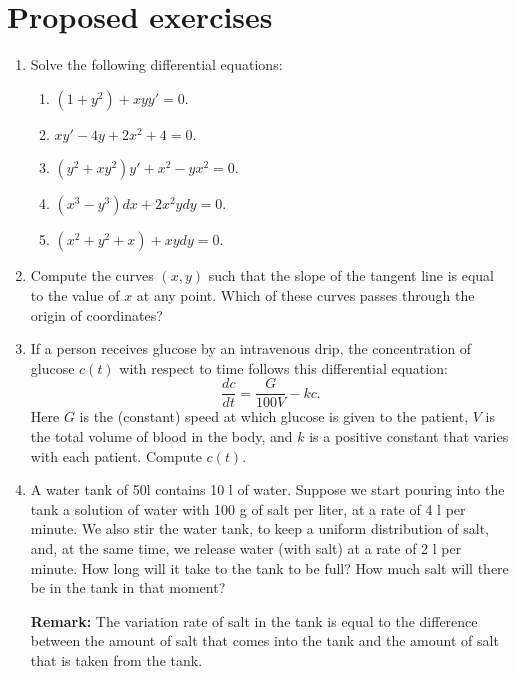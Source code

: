 \section{Proposed exercises}
\begin{enumerate}[leftmargin=*]

\item Solve the following differential equations:
\begin{enumerate}
\item $(1+y^{2})+xyy'=0$.
\item $xy'-4y+2x^2+4=0$.
\item $(y^{2}+xy^{2})y'+x^{2}-yx^{2}=0$.
\item $(x^3-y^3)dx+2x^2ydy=0$.
\item $(x^2+y^2+x)+xydy=0$.
\end{enumerate}

\item Compute the curves $(x,y)$ such that the slope of the tangent line is equal to the value of $x$ at any point.  
Which of these curves passes through the origin of coordinates?

\item If a person receives glucose by an intravenous drip, the concentration of glucose $c(t)$ with respect to time follows this differential equation:
\[
\frac{dc}{dt}=\frac{G}{100V}-kc.
\]
Here $G$ is the (constant) speed at which glucose is given to the patient, $V$ is the total volume of blood in the body, and $k$ is a positive constant that varies with each patient.
Compute $c(t)$.

\item A water tank of 50l contains 10 l of water.
Suppose we start pouring into the tank a solution of water with 100 g of salt per liter, at a rate of 4 l per minute.
We also stir the water tank, to keep a uniform distribution of salt, and, at the same time, we release water (with salt) at a rate of 2 l per minute.
How long will it take to the tank to be full?
How much salt will there be in the tank in that moment?

\noindent\textbf{Remark:} The variation rate of salt in the tank is equal to the difference between the amount of salt that comes into the tank and the amount of salt that is taken from the tank.
\end{enumerate}


